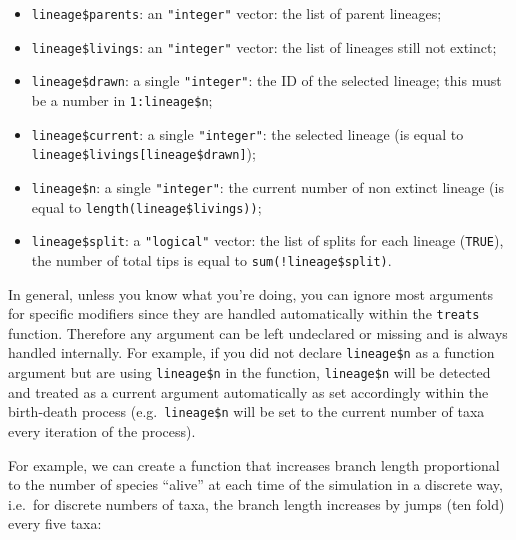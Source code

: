 \documentclass[
]{book}
\providecommand{\tightlist}{%
  \setlength{\itemsep}{0pt}\setlength{\parskip}{0pt}}
\begin{document}
\begin{itemize}
\tightlist
\item
  \texttt{lineage\$parents}: an \texttt{"integer"} vector: the list of parent lineages;
\item
  \texttt{lineage\$livings}: an \texttt{"integer"} vector: the list of lineages still not extinct;
\item
  \texttt{lineage\$drawn}: a single \texttt{"integer"}: the ID of the selected lineage; this must be a number in \texttt{1:lineage\$n};
\item
  \texttt{lineage\$current}: a single \texttt{"integer"}: the selected lineage (is equal to \texttt{lineage\$livings{[}lineage\$drawn{]}});
\item
  \texttt{lineage\$n}: a single \texttt{"integer"}: the current number of non extinct lineage (is equal to \texttt{length(lineage\$livings))};
\item
  \texttt{lineage\$split}: a \texttt{"logical"} vector: the list of splits for each lineage (\texttt{TRUE}), the number of total tips is equal to \texttt{sum(!lineage\$split)}.
\end{itemize}

In general, unless you know what you're doing, you can ignore most arguments for specific modifiers since they are handled automatically within the \texttt{treats} function.
Therefore any argument can be left undeclared or missing and is always handled internally. For example, if you did not declare \texttt{lineage\$n} as a function argument but are using \texttt{lineage\$n} in the function, \texttt{lineage\$n} will be detected and treated as a current argument automatically as set accordingly within the birth-death process (e.g.~\texttt{lineage\$n} will be set to the current number of taxa every iteration of the process).

For example, we can create a function that increases branch length proportional to the number of species ``alive'' at each time of the simulation in a discrete way, i.e.~for discrete numbers of taxa, the branch length increases by jumps (ten fold) every five taxa:
\end{document}
